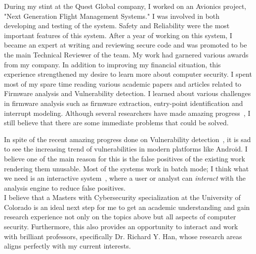 \documentclass{article}
\begin{document}
During my stint at the Quest Global company, I worked on an Avionics project, "Next Generation Flight Management Systems." I was involved in both developing and testing of the system. Safety and Reliability were the most important features of this system. After a year of working
 on this system, I became an expert at writing and reviewing secure code and was promoted to be the main Technical Reviewer of the team. My work had garnered various awards from my company. In addition to improving my financial situation, this experience strengthened my desire to learn more about computer security. I spent most of my spare time reading various academic papers and articles related to Firmware analysis and Vulnerability detection. I learned about various challenges in firmware analysis such as firmware extraction, entry-point identification and interrupt modeling. Although several researchers have made amazing progress~\cite{zaddach2014avatar, shoshitaishvili2015firmalice, costin2014large}, I still believe that there are some immediate problems that could be solved.

In spite of the recent amazing progress done on Vulnerability detection~\cite{machiry2017dr, redini2017bootstomp}, it is sad to see the increasing trend of vulnerabilities in modern platforms like Android. I believe one of the main reason for this is the false positives of the existing work rendering them unusable. Most of the systems work in batch mode; I think what we need is an interactive system~\cite{Mangal:2015:UAP:2786805.2786851}, where a user or analyst can \emph{interact} with the analysis engine to reduce false positives.\\

I believe that a Masters with Cybersecurity specialization at the University of Colorado is an ideal next step for me to get an academic understanding and gain research experience not only on the topics above but all aspects of computer security. Furthermore, this also provides an opportunity to interact and work with brilliant professors, specifically Dr. Richard Y. Han, whose research areas~\cite{ray2012securewear, beach2009solutions} aligns perfectly with my current interests.

\medskip

{}

\end{document}
